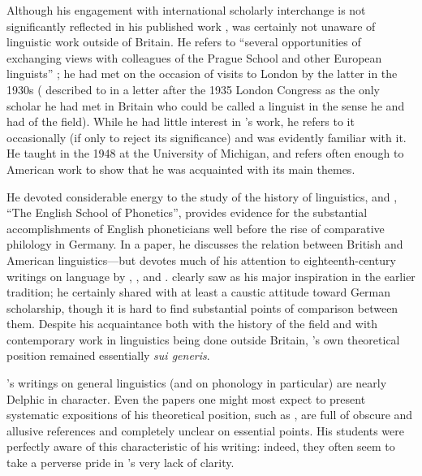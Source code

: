 Although his engagement with international scholarly interchange is
not significantly reflected in his published work
\citep[369]{plug08:firth.bio}, {\Firth} was certainly not unaware of
linguistic work outside of Britain. He refers to ``several
opportunities of exchanging views with colleagues of the {Prague School}
and other European linguists'' \citep{firth35:distribution}; he had met
{\Trubetzkoy} on the occasion of visits to London by the latter in the
1930s ({\Trubetzkoy} described {\Firth} to {\Jakobson} in a letter after the
1935 London Congress as the only scholar he had met in Britain who
could be called a linguist in the sense he and {\Jakobson} had of the
field). While he had little interest in {\Hjelmslev}'s work, he refers to
it occasionally (if only to reject its significance) and was evidently
familiar with it. He taught in the 1948  at the
University of Michigan, and refers often enough to American work to
show that he was acquainted with its main themes.

He devoted considerable energy to the study of the history of
linguistics, and \citet{firth46:english.school}, ``The {English} School
of Phonetics'', provides evidence for the substantial accomplishments
of {English} phoneticians well before the rise of comparative
 philology in Germany. In a \citeyear{firth49:atlantic}
paper, he discusses the relation between British and American
linguistics—but devotes much of his attention to eighteenth-century
writings on language by , , and . {\Firth} clearly saw {\Sweet} as his major inspiration in the
earlier tradition; he certainly shared with {\Sweet} at least a
caustic attitude toward {German} scholarship, though it is hard to find
substantial points of comparison between them. Despite his
acquaintance both with the history of the field and with contemporary
work in linguistics being done outside Britain, {\Firth}'s own
theoretical position remained essentially \textit{sui generis}.

{\Firth}'s writings on general linguistics (and on phonology in
particular) are nearly Delphic in character. Even the papers one might
most expect to present systematic expositions of his theoretical
position, such as \citealt{firth48:sounds:prosodies,firth57:synopsis},
are full of obscure and allusive references and completely unclear on
essential points. His students were perfectly aware of this
characteristic of his writing: indeed, they often seem to take a
perverse pride in {\Firth}'s very lack of clarity.

